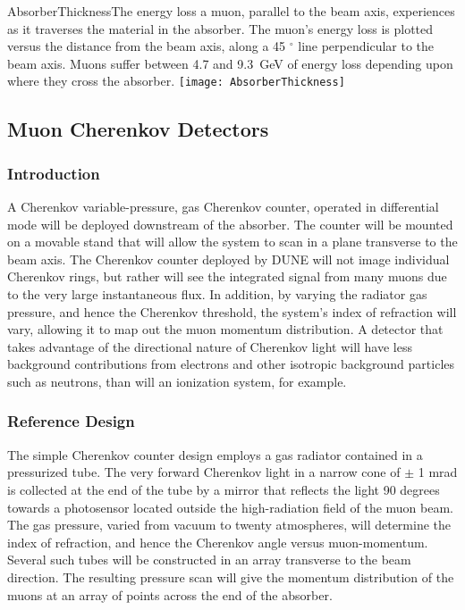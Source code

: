 \begin{cdrfigure}{AbsorberThickness}{The energy loss a muon, parallel to the beam axis, experiences as it traverses the material in the absorber. The muon's energy loss is plotted versus the distance from the beam axis, along a 45 $^\circ$ line perpendicular to the beam axis. Muons suffer between 4.7 and 9.3~GeV of energy loss depending upon where they cross the absorber.}
\texttt{[image: AbsorberThickness]}
\end{cdrfigure}

%
%
\subsection{Muon Cherenkov Detectors} %
\label{sec:nd-blm-muon-cherenkov}

\subsubsection{Introduction}

A Cherenkov variable-pressure, gas Cherenkov counter, operated in differential mode
will be deployed downstream of the absorber.  The counter will be mounted on a movable 
stand that will allow the system to scan in a plane transverse to the beam axis. 
The Cherenkov counter deployed by DUNE will not image individual Cherenkov rings, but rather will see the
integrated signal from many muons due to the very large instantaneous flux. 
In addition, by varying the radiator gas pressure, and hence the 
Cherenkov threshold, the system's index of refraction will vary, 
allowing it to map out the muon momentum distribution.
A detector that takes advantage of the directional nature of Cherenkov
light will have less background contributions from electrons and other isotropic 
background particles such as neutrons, than will an ionization system, for example. 


\subsubsection{Reference Design}

The simple Cherenkov counter design
employs a gas radiator contained in a pressurized tube. The very forward
Cherenkov light in a narrow cone of $\pm$ 1 mrad is collected at the end of the tube
by a mirror that reflects the light 90 degrees towards a photosensor
located outside the high-radiation field of the muon beam. The gas
pressure, varied from vacuum to twenty atmospheres, will determine
the index of refraction, and hence the Cherenkov angle versus muon-momentum. 
Several such tubes will be constructed in an array
transverse to the beam direction. The resulting pressure scan will
give the momentum distribution of the muons at an array of points
across the end of the absorber.  

